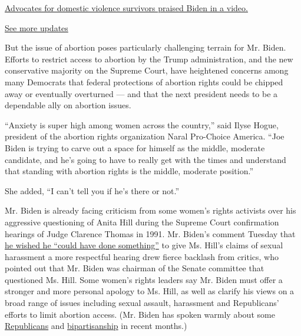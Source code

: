 \href{https://www.nytimes3xbfgragh.onion/live/2020/08/19/us/dnc-convention-election?action=click\&pgtype=Article\&state=default\&region=MAIN_CONTENT_1\&context=storylines_live_updates\#advocates-for-domestic-violence-survivors-praised-biden-in-a-video}{Advocates
for domestic violence survivors praised Biden in a video.}

\href{https://www.nytimes3xbfgragh.onion/live/2020/08/19/us/dnc-convention-election?action=click\&pgtype=Article\&state=default\&region=MAIN_CONTENT_1\&context=storylines_live_updates}{See
more updates}

But the issue of abortion poses particularly challenging terrain for Mr.
Biden. Efforts to restrict access to abortion by the Trump
administration, and the new conservative majority on the Supreme Court,
have heightened concerns among many Democrats that federal protections
of abortion rights could be chipped away or eventually overturned ---
and that the next president needs to be a dependable ally on abortion
issues.

``Anxiety is super high among women across the country,'' said Ilyse
Hogue, president of the abortion rights organization Naral Pro-Choice
America. ``Joe Biden is trying to carve out a space for himself as the
middle, moderate candidate, and he's going to have to really get with
the times and understand that standing with abortion rights is the
middle, moderate position.''

She added, ``I can't tell you if he's there or not.''

Mr. Biden is already facing criticism from some women's rights activists
over his aggressive questioning of Anita Hill during the Supreme Court
confirmation hearings of Judge Clarence Thomas in 1991. Mr. Biden's
comment Tuesday that
\href{https://www.nytimes3xbfgragh.onion/2019/03/26/us/politics/biden-anita-hill.html}{he
wished he ``could have done something''} to give Ms. Hill's claims of
sexual harassment a more respectful hearing drew fierce backlash from
critics, who pointed out that Mr. Biden was chairman of the Senate
committee that questioned Ms. Hill. Some women's rights leaders say Mr.
Biden must offer a stronger and more personal apology to Ms. Hill, as
well as clarify his views on a broad range of issues including sexual
assault, harassment and Republicans' efforts to limit abortion access.
(Mr. Biden has spoken warmly about some
\href{https://www.nytimes3xbfgragh.onion/2019/01/23/us/politics/biden-speech-fred-upton.html}{Republicans}
and
\href{https://www.nytimes3xbfgragh.onion/2019/01/24/us/politics/biden-praise-republican-speaking-fee.html}{bipartisanship}
in recent months.)

